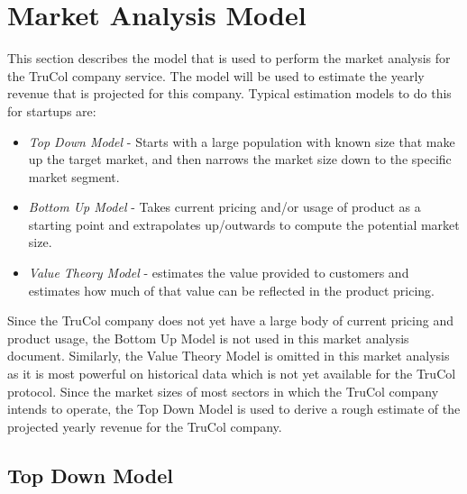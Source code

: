 \section{Market Analysis Model}\label{sec:market_analysis_model}
This section describes the model that is used to perform the market analysis for the TruCol company service. The model will be used to estimate the yearly revenue that is projected for this company. Typical estimation models to do this for startups are:
\begin{itemize}
	\item \textit{Top Down Model} - Starts with a large population with known size that make up the target market, and then narrows the market size down to the specific market segment.
	\item \textit{Bottom Up Model} - Takes current pricing and/or usage of product as a starting point and extrapolates up/outwards to compute the potential market size.
	\item \textit{Value Theory Model} - estimates the value provided to customers and estimates how much of that value can be reflected in the product pricing.
\end{itemize}

\noindent Since the TruCol company does not yet have a large body of current pricing and product usage, the Bottom Up Model is not used in this market analysis document. Similarly, the Value Theory Model is omitted in this market analysis as it is most powerful on historical data which is not yet available for the TruCol protocol. Since the market sizes of most sectors in which the TruCol company intends to operate, the Top Down Model is used to derive a rough estimate of the projected yearly revenue for the TruCol company.

\subsection{Top Down Model}\label{subsec:results_top_down}
